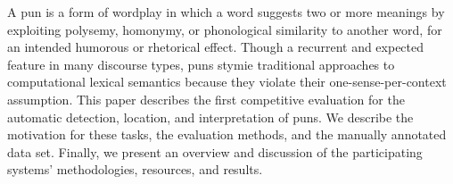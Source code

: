 A pun is a form of wordplay in which a word suggests two or more meanings by exploiting polysemy, homonymy, or phonological similarity to another word, for an intended humorous or rhetorical effect.  Though a recurrent and expected feature in many discourse types, puns stymie traditional approaches to computational lexical semantics because they violate their one-sense-per-context assumption.  This paper describes the first competitive evaluation for the automatic detection, location, and interpretation of puns. We describe the motivation for these tasks, the evaluation methods, and the manually annotated data set.  Finally, we present an overview and discussion of the participating systems' methodologies, resources, and results.
